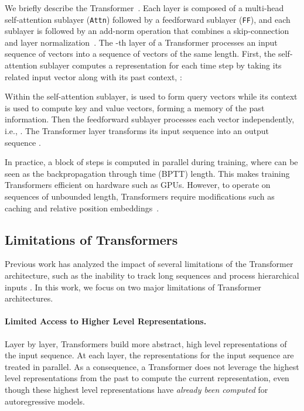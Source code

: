 \documentclass{article} \usepackage{iclr2021_conference}
\begin{document}
We briefly describe the Transformer~\citep{vaswani2017attention}.
Each layer is composed of a multi-head self-attention sublayer (\texttt{Attn}) followed by a feedforward sublayer (\texttt{FF}), and each sublayer is followed by an add-norm operation that combines a skip-connection~\citep{he2016deep} and layer normalization~\citep{ba2016layer}.
The -th layer of a Transformer processes an input sequence of vectors  into a sequence of vectors of the same length.
First, the self-attention sublayer computes a representation for each time step  by taking its related input vector  along with its past context, :

Within the self-attention sublayer,  is used to form query vectors while its context is used to compute key and value vectors, forming a memory of the past information.
Then the feedforward sublayer processes each vector  independently, i.e., .
The Transformer layer transforms its input sequence into an output sequence .

In practice, a block of steps  is computed in parallel during training, where  can be seen as the backpropagation through time (BPTT) length. This makes training Transformers efficient on hardware such as GPUs. However, to operate on sequences of unbounded length, Transformers require modifications such as caching and relative position embeddings~\citep{dai2019transformer,sukhbaatar2019adaptive}.

\subsection{Limitations of Transformers}
Previous work has analyzed the impact of several limitations of the Transformer architecture, such as the inability to track long sequences and process hierarchical inputs \citep{hahn2020theoretical}. In this work, we focus on two major limitations of Transformer architectures.

\paragraph{Limited Access to Higher Level Representations.} Layer by layer, Transformers build more abstract, high level representations of the input sequence. 
At each layer, the representations for the input sequence are treated in parallel.
As a consequence, a Transformer does not leverage the highest level representations from the past to compute the current representation, even though these highest level representations have \emph{already been computed} for autoregressive models.
\end{document}

